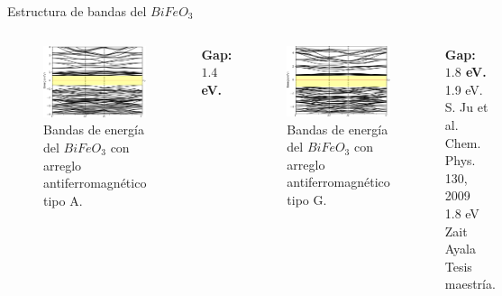 \begin{frame}{Estructura de bandas del $BiFeO_{3}$}
\begin{columns}[t]
    \begin{figure}[H]
        \centering
        \includegraphics[width=1.0\textwidth]{contenido/resultados/img_resultados/BFO_bandas_A.png}
        \caption{Bandas de energ\'ia del $BiFeO_{3}$ con arreglo         
        antiferromagn\'etico tipo A.}
    \end{figure}
\centering
\textbf{Gap: $1.4$ eV.}
    \begin{figure}[H]
        \centering
        \includegraphics[width=1.0\textwidth]{contenido/resultados/img_resultados/BFO_bandas_G.png}
        \caption{Bandas de energ\'ia del $BiFeO_{3}$ con arreglo 
            antiferromagn\'etico tipo G.}
    \end{figure}
\centering
\textbf{Gap: $1.8$ eV.} \\
{\scriptsize 1.9 eV. S. Ju et al. Chem. Phys. 130, 2009 } \\
{\scriptsize 1.8 eV Zait Ayala Tesis maestr\'ia. }
\end{columns}    
\end{frame}

